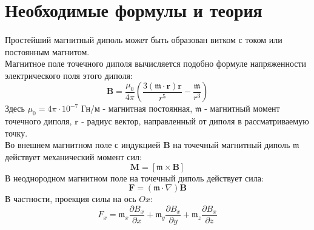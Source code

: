 \documentclass[a4paper, 10pt]{article}
\begin{document}
\section*{Необходимые формулы и теория}
\paragraph{}
Простейший магнитный диполь может быть образован витком с током или постоянным магнитом.\\
Магнитное поле точечного диполя вычисляется подобно формуле напряженности электрического поля этого диполя:
\begin{equation}
    \mathbf{B} = \frac{\mu_{0}}{4 \pi}\left(\frac{3({\mathfrak{m}} \cdot \mathbf{r}) \mathbf{r}}{r^{5}} - \frac{{\mathfrak{m}}}{r^{3}}\right)
    \label{Магнитное поле диполя}
\end{equation}
Здесь $\mu_{0} = 4\pi \cdot 10^{-7}$ Гн/м - магнитная постоянная, $\mathbf{\mathfrak{m}}$ - магнитный момент точечного диполя, $\mathbf{r}$ - радиус вектор, направленный от диполя в рассматриваемую точку.\\
Во внешнем магнитном поле с индукцией $\mathbf{B}$ на точечный магнитный диполь $\mathfrak{m}$ действует механический момент сил:
\begin{equation}
    \mathbf{M} = [\mathfrak{m} \times \mathbf{B}]
    \label{Момент}
\end{equation}
В неоднородном магнитном поле на точечный диполь действует сила:
\begin{equation}
    \mathbf{F} = (\mathfrak{m} \cdot \nabla)\mathbf{B}
    \label{Сила действия на диполь}
\end{equation}
В частности, проекция силы на ось $\mathit{Ox}$:
\begin{equation}
    F_{x} = \mathfrak{m}_{x}\frac{\partial B_{x}}{\partial x} + \mathfrak{m}_{y}\frac{\partial B_{x}}{\partial y} + \mathfrak{m}_{z}\frac{\partial B_{x}}{\partial z}
    \label{Проекция силы}
\end{equation}
\end{document}
